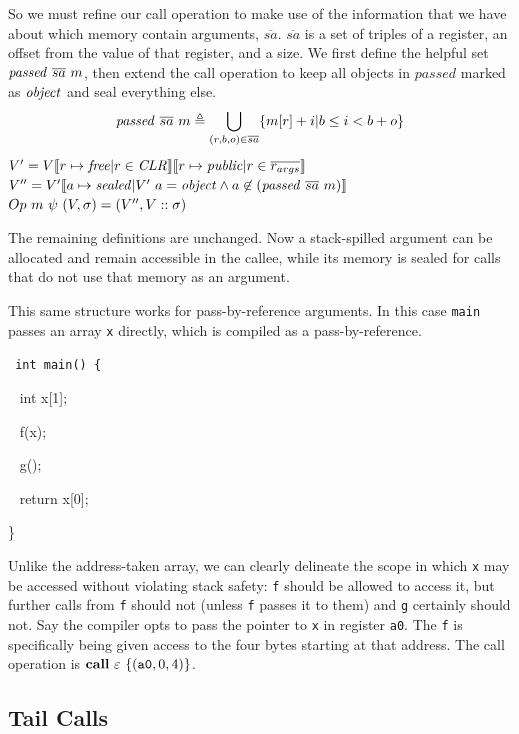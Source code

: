 \documentclass[10pt,conference]{ieeetran}%
\theoremstyle{definition}
\begin{document}
So we must refine our call operation to make use of the information that we have about
which memory contain arguments, \(\overline{sa}\). \(\overline{sa}\) is a set of
triples of a register, an offset from the value of that register, and a size.
We first define the helpful set \(\mathit{passed} ~ \overline{sa} ~ m\),
then extend the call operation to keep all objects in \(\mathit{passed}\) marked
as \(\mathit{object}\) and seal everything else.
%
\[\mathit{passed} ~ \overline{sa} ~ m \triangleq
\bigcup_{(r,b,o) \in \overline{sa}} \{m[r]+i | b \leq i < b+o\}\]
%
             {\(V' = V \llbracket r \mapsto \mathit{free} | r \in \mathit{CLR} \rrbracket
               \llbracket r \mapsto \mathit{public} | r \in \overline{r_{args}} \rrbracket\)}
             {\(V'' = V'\llbracket a \mapsto \mathit{sealed} | V' ~ a = \mathit{object} \land a \not \in (\mathit{passed} ~ \overline{sa} ~ m) \rrbracket\)}
             {\(Op ~ m ~ \psi ~ (V,\sigma) =
               (V'',V::\sigma)\)}

The remaining definitions are unchanged. Now a stack-spilled argument can be allocated
and remain accessible in the callee, while its memory is sealed for calls that do not
use that memory as an argument.

This same structure works for pass-by-reference arguments. In this case {\tt main}
passes an array {\tt x} directly, which is compiled as a pass-by-reference.

{\tt
  int main() \{
  
  ~ int x[1];

  ~ f(x);

  ~ g();

  ~ return x[0];

  \}
}

Unlike the address-taken array, we can clearly delineate the scope in which {\tt x} may be
accessed without violating stack safety: {\tt f} should be allowed to access it, but further
calls from {\tt f} should not (unless {\tt f} passes it to them) and {\tt g} certainly
should not. Say the compiler opts to pass the pointer to {\tt x} in register {\tt a0}.
The {\tt f} is specifically being given access to the four bytes starting at that address.
The call operation is \(\mathbf{call} ~ \varepsilon ~ \{(\mathtt{a0},0,4)\}\).

\subsection{Tail Calls}
\end{document}
